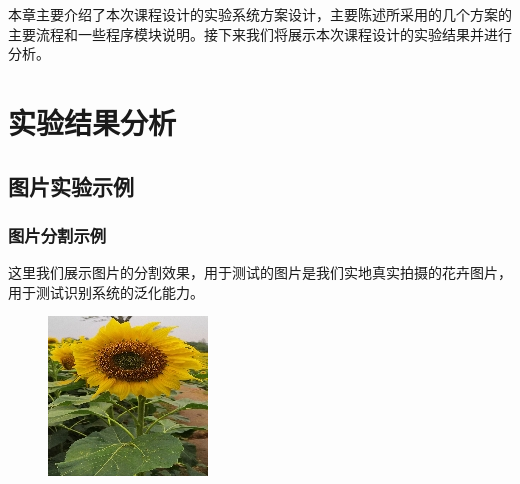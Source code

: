 \documentclass[supercite]{HustGraduPaper}
\begin{document}
\begin{sloppypar}
  本章主要介绍了本次课程设计的实验系统方案设计，主要陈述所采用的几个方案的主要流程和一些程序模块说明。接下来我们将展示本次课程设计的实验结果并进行分析。
  \section{实验结果分析}
  \subsection{图片实验示例}
  \subsubsection{图片分割示例}
  这里我们展示图片的分割效果，用于测试的图片是我们实地真实拍摄的花卉图片，用于测试识别系统的泛化能力。
  \begin{figure}[H]
    \begin{minipage}[t]{0.24\textwidth}
    \centering
     \includegraphics[scale=0.55]{te1.jpg}


\end{minipage}
\end{figure}
\end{sloppypar}
\end{document}
